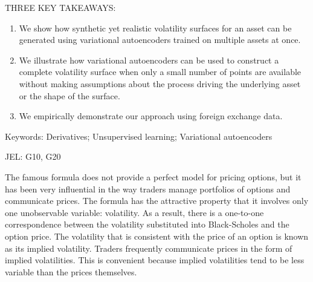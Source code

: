 \documentclass[12pt]{article}
\begin{document}

\vspace{0.5cm}


THREE KEY TAKEAWAYS:

\begin{enumerate}
  \item We show how synthetic yet realistic volatility surfaces for an asset can be generated  using variational autoencoders trained on multiple assets at once.
  \item We illustrate how variational autoencoders can be used to construct a complete volatility surface when only a small number of points are available without making assumptions about the process driving the underlying asset or the shape of the surface.
  \item We empirically demonstrate our approach using foreign exchange data.  
\end{enumerate}


Keywords: Derivatives; Unsupervised learning; Variational autoencoders

JEL: G10, G20

\newpage



The famous \citet{blackscholes} formula does not provide a perfect model for pricing options, but it has been very influential in the way traders manage portfolios of options and communicate prices. The formula has the attractive property that it involves only one unobservable variable: volatility. As a result, there is a one-to-one correspondence between the volatility substituted into Black-Scholes and the option  price. The volatility that is consistent with the price of an option is known as its implied volatility. Traders frequently communicate prices in the form of implied volatilities.  This is convenient because implied volatilities tend to be less variable than the prices themselves. 
\end{document}
